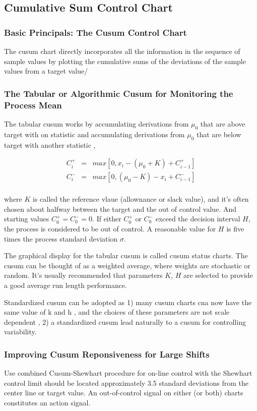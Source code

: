 \documentclass[12pt,oneside,a4paper]{article}
\numberwithin{equation}{section}
\begin{document}
\subsection{Cumulative Sum Control Chart}
\subsubsection{Basic Principals: The Cusum Control Chart}
The cusum chart directly incorporates all the information in the sequence of sample values by plotting the cumulative sums of the deviations of the sample values from a target value/

\subsubsection{The Tabular or Algorithmic Cusum for Monitoring the Process Mean}
The tabular cusum works by accumulating derivations from $\mu_0$ that are above target with on statistic and accumulating derivations from $\mu_0$ that are below target with another statistic , 

\begin{eqnarray*}
C_i^{+} &=& max[0, x_i - (\mu_0 + K) + C_{i-1}^+] \\
C_i^{-} &=& max[0, (\mu_0 - K) - x_i + C_{i-1}^-] \\
\end{eqnarray*}

where $K$ is called the reference vlaue (allownance or slack value), and it's often chosen about halfway between the target and the out of control value. And starting values $C_0^+ = C_0^- = 0$. If either  $C_0^+$ or  $C_0^-$ exceed the decision interval $H$, the process is considered to be out of control. A reasonable value for $H$ is five times the process standard deviation $\sigma$.


The graphical display for the tabular cusum is called cusum status charts.  The cusum can be thought of as a weighted average, where weights are stochastic or random.  It's usually recommended that parameters $K$, $H$ are selected to provide a good average run length performance.


Standardized cusum can be adopted as 1) many cusum charts cna now have the same value of k and h , and the choices of these parameters are not scale dependent
, 2) a standardized cusum lead naturally to a cusum for controlling variability. 


\subsubsection{Improving Cusum Reponsiveness for Large Shifts}
Use combined Cusum-Shewhart procedure for on-line control with the Shewhart control limit should be located approximately 3.5 standard deviations from the center line or target value. An out-of-control signal on either (or both) charts constitutes an action signal. 
\end{document}
